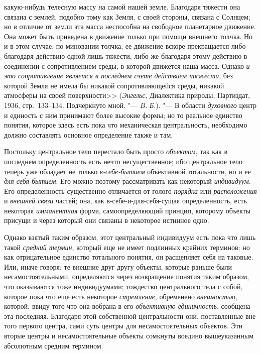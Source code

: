 {{{какую-нибудь телесную массу на самой нашей земле. Благодаря
тяжести она связана с землей, подобно тому как Земля, с своей стороны,
связана с Солнцем; но в отличие от земли эта масса неспособна на свободное
планетарное движение. Она может быть приведена в движение только при помощи
внешнего толчка. Но и в этом случае, по миновании толчка, ее движение
вскоре прекращается либо благодаря действию одной лишь тяжести, либо же
благодаря этому действию в соединении с сопротивлением среды, в которой
движется наша масса. Однако {\em и это сопротивление является в последнем
счете действием тяжести}, без которой Земля не имела бы никакой
сопротивляющейся среды, никакой атмосферы на своей поверхности>>
({\em Энгельс}, Диалектика природы, Партиздат, 1936, стр.~133--134.
Подчеркнуто мной. "--- $B$. {\em Б}.)\label{bkm:bm73}}.
"--- В области {\em духовного} центр и
единость с ним принимают более высокие формы; но то реальное единство
понятия, которое здесь есть пока что механическая центральность, необходимо
должно составлять основное определение также и там.

Постольку центральное тело перестало быть просто
{\em объектом}, так как в
последнем определенность есть нечто несущественное; ибо центральное тело
теперь уже обладает не только
{\em в-себе-бытием}
объективной тотальности, но и ее
{\em для-себя-бытием}.
Его можно поэтому рассматривать как некоторый
{\em индивидуум}. Его
определенность существенно отличается от голого
{\em порядка} или
{\em расположения} и
{\em внешней связи}
частей; она, как в-себе-и-для-себя-сущая определенность, есть
некоторая {\em имманентная}
форма, самоопределяющий принцип, которому объекты присущи и
через который они связаны в некоторое истинное одно.

Однако взятый таким образом, этот центральный индивидуум есть
пока что лишь такой {\em средний
термин}, который еще не имеет подлинных крайних терминов; но
как отрицательное единство тотального понятия, он расщепляет себя на
таковые. Или, иначе говоря: те внешние друг другу объекты, которые раньше
были несамостоятельными, определяются через возвращение понятия таким
образом, что оказываются тоже индивидуумами; тождество центрального тела с
собой, которое пока что еще есть некоторое {\em стремление}, обременено
{\em внешностью}, которой, ввиду того что она вобрана в его
{\em объективную единичность}, сообщена эта последняя.
Благодаря этой собственной
центральности они, поставленные вне того первого центра, сами суть центры
для несамостоятельных объектов. Эти вторые центры и несамостоятельные
объекты сомкнуты воедино вышеуказанным абсолютным средним
термином.

}}
